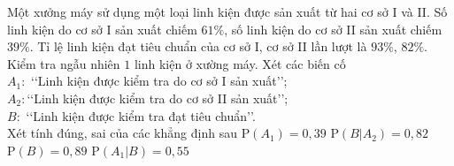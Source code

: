 \begin{ex}%
	Một xưởng máy sử dụng một loại linh kiện được sản xuất từ hai cơ sở I và II. Số linh kiện do cơ sở I sản xuất chiếm $61 \%$, số linh kiện do cơ sở II sản xuất chiếm $39 \%$. Tỉ lệ linh kiện đạt tiêu chuẩn của cơ sở I, cơ sở II lần lượt là $93 \%$, $82 \%$. Kiểm tra ngẫu nhiên $1$ linh kiện ở xường máy. Xét các biến cố\\
	$A_1\colon$ \lq\lq Linh kiện được kiểm tra do cơ sở I sản xuất\rq\rq;\\
	$A_2\colon$\lq\lq Linh kiện được kiểm tra do cơ sở II sản xuất\rq\rq;\\
	$B\colon$ \lq\lq Linh kiện được kiểm tra đạt tiêu chuẩn\rq\rq.\\
	Xét tính đúng, sai của các khẳng định sau
	\choiceTF
	{$\mathrm{P}\left(A_1\right)=0{,}39$} 
	{\True $\mathrm{P}\left(B | A_2\right)=0{,}82$}
	{$\mathrm{P}(B)=0{,}89$}
	{\True $\mathrm{P}\left(A_1 | B\right)=0{,}55$}
\end{ex}

